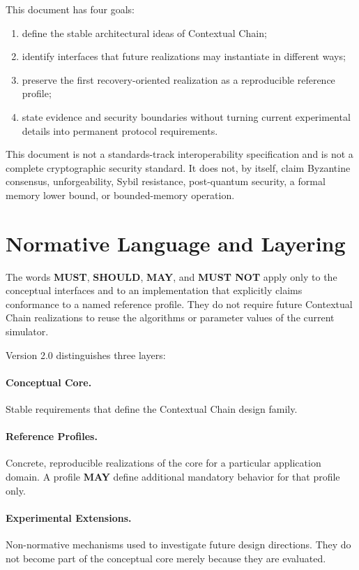 \documentclass[11pt]{article}
\begin{document}
This document has four goals:
\begin{enumerate}[label=(\arabic*)]
  \item define the stable architectural ideas of Contextual Chain;
  \item identify interfaces that future realizations may instantiate in different ways;
  \item preserve the first recovery-oriented realization as a reproducible reference profile;
  \item state evidence and security boundaries without turning current experimental details into permanent protocol requirements.
\end{enumerate}

This document is not a standards-track interoperability specification and is not a complete
cryptographic security standard. It does not, by itself, claim Byzantine consensus, unforgeability,
Sybil resistance, post-quantum security, a formal memory lower bound, or bounded-memory
operation.

\section{Normative Language and Layering}
The words \textbf{MUST}, \textbf{SHOULD}, \textbf{MAY}, and \textbf{MUST NOT} apply only to the
conceptual interfaces and to an implementation that explicitly claims conformance to a named
reference profile. They do not require future Contextual Chain realizations to reuse the algorithms
or parameter values of the current simulator.

Version 2.0 distinguishes three layers:

\paragraph{Conceptual Core.}
Stable requirements that define the Contextual Chain design family.

\paragraph{Reference Profiles.}
Concrete, reproducible realizations of the core for a particular application domain. A profile
\textbf{MAY} define additional mandatory behavior for that profile only.

\paragraph{Experimental Extensions.}
Non-normative mechanisms used to investigate future design directions. They do not become
part of the conceptual core merely because they are evaluated.
\end{document}
